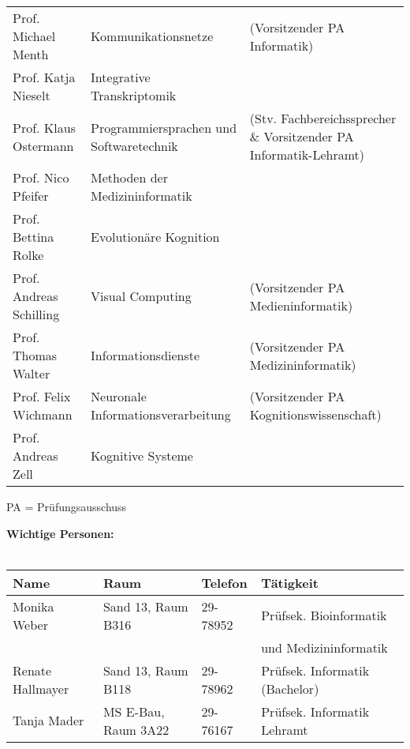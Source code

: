 \begin{tabular}{|lll|}
Prof. Michael Menth           & Kommunikationsnetze 		& (Vorsitzender PA Informatik)\\
Prof. Katja Nieselt	          & Integrative Transkriptomik	 & \\
    Prof. Klaus Ostermann	      & Programmiersprachen und Softwaretechnik & (Stv. Fachbereichssprecher \& Vorsitzender PA Informatik-Lehramt) \\
Prof. Nico Pfeifer			  & Methoden der Medizininformatik &\\
Prof. Bettina Rolke 		  & Evolutionäre Kognition &\\
Prof. Andreas Schilling       & Visual Computing &(Vorsitzender PA Medieninformatik)\\
Prof. Thomas Walter           & Informationsdienste			 & (Vorsitzender PA Medizininformatik) \\
Prof. Felix Wichmann          & Neuronale Informationsverarbeitung &  (Vorsitzender PA Kognitionswissenschaft)	\\
Prof. Andreas Zell            & Kognitive Systeme 		 &\\
\hline
\end{tabular}
\scriptsize{PA = Prüfungsausschuss}


\textbf{Wichtige Personen:}\\\\
\begin{tabular}{|llll|}
\hline
Name                  & Raum		       & Telefon    & Tätigkeit \hfill\\
\hline
\hline
Monika Weber          & Sand 13, Raum B316    & 29-78952   & Prüfsek. Bioinformatik\\
                      &                       &            & und Medizininformatik \\
Renate Hallmayer      & Sand 13, Raum B118    & 29-78962   & Prüfsek. Informatik (Bachelor) \\
Tanja Mader      & MS E-Bau, Raum 3A22    & 29-76167   & Prüfsek. Informatik Lehramt \\
\hline
\end{tabular} \\

